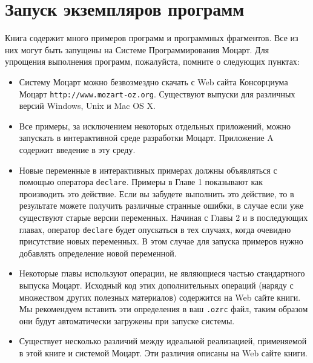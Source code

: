 \chapter*{Запуск экземпляров программ}



Книга содержит много примеров программ и программных фрагментов. Все из них могут быть запущены на Системе Программирования Моцарт. Для упрощения выполнения программ, пожалуйста, помните о следующих пунктах:

\begin{itemize}
\item{Систему Моцарт можно безвозмездно скачать с Web сайта Консорциума Моцарт \verb|http://www.mozart-oz.org|. Существуют выпуски для различных версий Windows, Unix и Mac OS X.}

\item{Все примеры, за исключением некоторых отдельных приложений, можно запускать в интерактивной среде разработки Моцарт. Приложение A содержит введение в эту среду.}

\item{Новые переменные в интерактивных примерах должны объявляться с помощью оператора \lstinline!declare!. Примеры в Главе 1 показывают как производить это действие. Если вы забудете выполнить это действие, то в результате можете получить различные странные ошибки, в случае если уже существуют старые версии переменных. Начиная с Главы 2 и в последующих главах, оператор \lstinline!declare! будет опускаться в тех случаях, когда очевидно присутствие новых переменных. В этом случае для запуска примеров нужно добавлять определение новой переменной.}

\item{Некоторые главы используют операции, не являющиеся частью стандартного выпуска Моцарт. Исходный код этих дополнительных операций (наряду с множеством других полезных материалов) содержится на Web сайте книги. Мы рекомендуем вставить эти определения в ваш \verb|.ozrc| файл, таким образом они будут автоматически загружены при запуске системы.}

\item{Существует несколько различий между идеальной реализацией, применяемой в этой книге и системой Моцарт. Эти различия описаны на Web сайте книги.}
\end{itemize}
